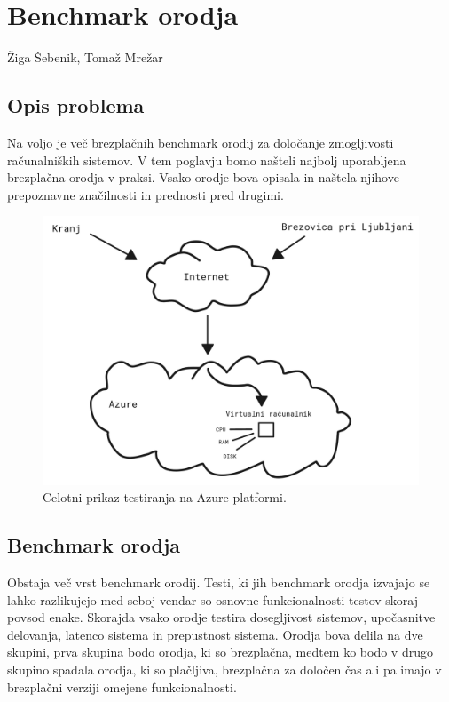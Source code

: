 \chapter[Benchmark orodja]{Benchmark orodja}

\pagestyle{fancy}
\fancyhf{}
\fancyhead[LE,RO]{\thepage}
\fancyhead[RE,LO]{\leftmark}

\huge Žiga Šebenik, Tomaž Mrežar
\normalsize
\bigskip

\section{Opis problema}
Na voljo je več brezplačnih benchmark orodij za določanje zmogljivosti računalniških sistemov. V tem poglavju bomo našteli najbolj uporabljena brezplačna orodja v praksi.
Vsako orodje bova opisala in naštela njihove prepoznavne značilnosti in prednosti pred drugimi.
  
\begin{figure}[H]
	\centering
	\includegraphics[scale=0.15]{Img/celotni_diagram.png}
	\caption{Celotni prikaz testiranja na Azure platformi.}
	\label{fig:7_breme2}
\end{figure}

\section{Benchmark orodja}
Obstaja več vrst benchmark orodij. Testi, ki jih benchmark orodja izvajajo se lahko razlikujejo med seboj vendar so osnovne funkcionalnosti testov skoraj povsod enake. Skorajda vsako orodje testira dosegljivost sistemov, upočasnitve delovanja, latenco sistema in prepustnost sistema. Orodja bova delila na dve skupini, prva skupina bodo orodja, ki so brezplačna, medtem ko bodo v drugo skupino spadala orodja, ki so plačljiva, brezplačna za določen čas ali pa imajo v brezplačni verziji omejene funkcionalnosti.

